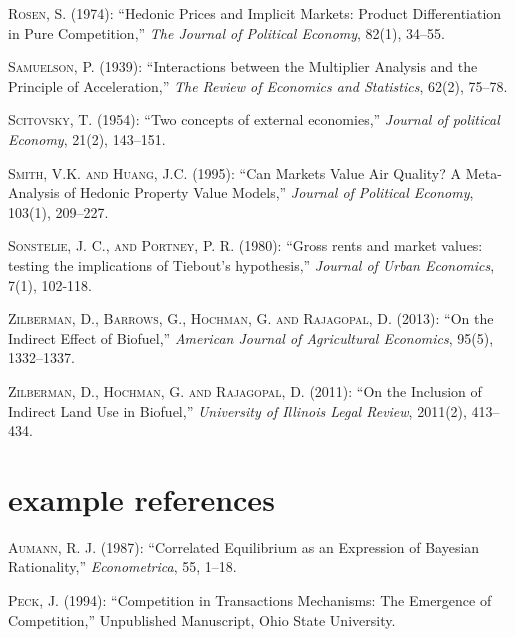 \documentclass[ecta,nameyear,draft]{econsocart}
\theoremstyle{plain}
\theoremstyle{remark}
\begin{document}
\begin{thebibliography}{}
\textsc{Rosen, S.} (1974):
``Hedonic Prices and Implicit Markets: Product Differentiation in Pure Competition,''
\textit{The Journal of Political Economy}, 82(1), 34--55.
\endbibitem

\textsc{Samuelson, P.} (1939):
``Interactions between the Multiplier Analysis and the Principle of Acceleration,''
\textit{The Review of Economics and Statistics}, 62(2), 75--78.
\endbibitem

\textsc{Scitovsky, T.} (1954):
``Two concepts of external economies,''
\textit{Journal of political Economy}, 21(2), 143--151.
\endbibitem


\textsc{Smith, V.K. and Huang, J.C.} (1995):
``Can Markets Value Air Quality? A Meta-Analysis of Hedonic Property Value Models,''
\textit{Journal of Political Economy}, 103(1), 209--227.
\endbibitem


\textsc{Sonstelie, J. C., and Portney, P. R.} (1980):
``Gross rents and market values: testing the implications of Tiebout's hypothesis,''
\textit{Journal of Urban Economics}, 7(1), 102-118.
\endbibitem



\textsc{Zilberman, D., Barrows, G., Hochman, G. and Rajagopal, D.} (2013):
``On the Indirect Effect of Biofuel,''
\textit{American Journal of Agricultural Economics}, 95(5), 1332--1337.
\endbibitem

\textsc{Zilberman, D., Hochman, G. and Rajagopal, D.} (2011):
``On the Inclusion of Indirect Land Use in Biofuel,''
\textit{University of Illinois Legal Review}, 2011(2), 413--434.
\endbibitem

\section{example references}

\textsc{Aumann, R. J.} (1987):
``Correlated Equilibrium as an Expression of Bayesian Rationality,''
\textit{Econometrica}, 55, 1--18.
\endbibitem

\textsc{Peck, J.} (1994):
``Competition in Transactions Mechanisms: The Emergence of Competition,''
Unpublished Manuscript, Ohio State University.
\endbibitem


\end{thebibliography}
\end{document}
